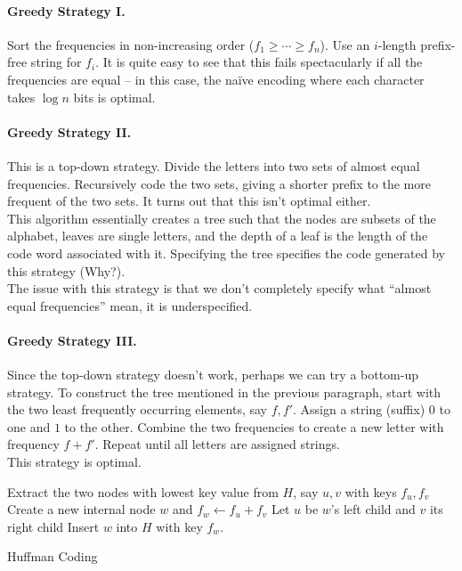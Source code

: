\paragraph{Greedy Strategy I.} Sort the frequencies in non-increasing order ($f_1\geq\cdots\geq f_n$). Use an $i$-length prefix-free string for $f_i$. It is quite easy to see that this fails spectacularly if all the frequencies are equal -- in this case, the na\"ive  encoding where each character takes $\log n$ bits is optimal.

\paragraph{Greedy Strategy II.} This is a top-down strategy. Divide the letters into two sets of almost equal frequencies. Recursively code the two sets, giving a shorter prefix to the more frequent of the two sets. It turns out that this isn't optimal either.\\ %
This algorithm essentially creates a tree such that the nodes are subsets of the alphabet, leaves are single letters, and the depth of a leaf is the length of the code word associated with it. Specifying the tree specifies the code generated by this strategy (Why?).\\
The issue with this strategy is that we don't completely specify what ``almost equal frequencies'' mean, it is underspecified.

\paragraph{Greedy Strategy III.} Since the top-down strategy doesn't work, perhaps we can try a bottom-up strategy. To construct the tree mentioned in the previous paragraph, start with the two least frequently occurring elements, say $f,f'$. Assign a string (suffix) $0$ to one and $1$ to the other. Combine the two frequencies to create a new letter with frequency $f+f'$. Repeat until all letters are assigned strings.\\
This strategy is optimal.

\begin{algorithm*}
	\DontPrintSemicolon
	\SetNoFillComment
	 {
		Extract the two nodes with lowest key value from $H$, say $u,v$ with keys $f_u,f_v$\;
		Create a new internal node $w$ and $f_w\gets f_u+f_v$\;
		Let $u$ be $w$'s left child and $v$ its right child\;
		Insert $w$ into $H$ with key $f_w$.
	}
	\caption{Huffman Coding}\label{algo: huffman coding}
\end{algorithm*}

